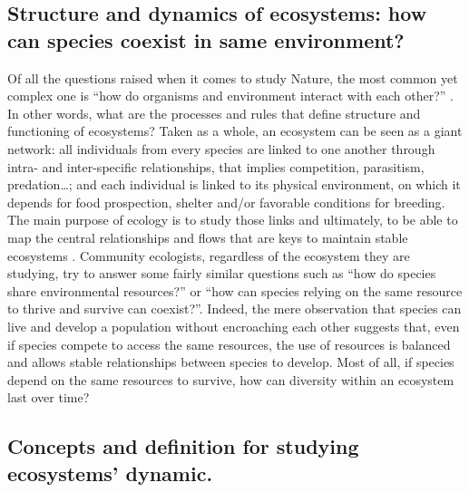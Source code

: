 

\subsection{Structure and dynamics of ecosystems: how can species coexist in same environment?} 

Of all the questions raised when it comes to study Nature, the most common yet complex one is “how do organisms and environment interact with each other?” \citep{sutherland2013}. In other words, what are the processes and rules that define structure and functioning of ecosystems? Taken as a whole, an ecosystem can be seen as a giant network: all individuals from every species are linked to one another through intra- and inter-specific relationships, that implies competition, parasitism, predation\ldots{}; and each individual is linked to its physical environment, on which it depends for food prospection, shelter and/or favorable conditions for breeding. The main purpose of ecology is to study those links and ultimately, to be able to map the central relationships and flows that are keys to maintain stable ecosystems \citep{albouy2011}. Community ecologists, regardless of the ecosystem they are studying, try to answer some fairly similar questions such as “how do species share environmental resources?” or “how can species relying on the same resource to thrive and survive can coexist?”. Indeed, the mere observation that species can live and develop a population without encroaching each other suggests that, even if species compete to access the same resources, the use of resources is balanced and allows stable relationships between species to develop. Most of all, if species depend on the same resources to survive, how can diversity within an ecosystem last over time?

\subsection{Concepts and definition for studying ecosystems’ dynamic.}
 
